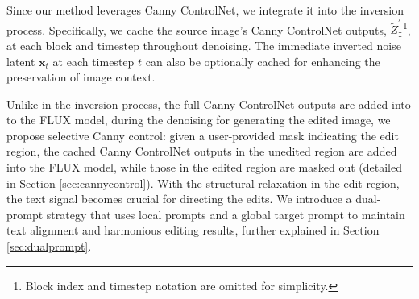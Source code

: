\documentclass{article}
\begin{document}
Since our method leverages Canny ControlNet, we integrate it into the inversion process. Specifically, we cache the source image's Canny ControlNet outputs, $\tilde{Z}^{\prime}_{\texttt{I}}$\footnote{Block index and timestep notation are omitted for simplicity.}, at each block and timestep throughout denoising. The immediate inverted noise latent $\mathbf{x}_t$ at each timestep $t$ can also be optionally cached for enhancing the preservation of image context.


Unlike in the inversion process, the full Canny ControlNet outputs are added into to the FLUX model, during the denoising for generating the edited image, we propose selective Canny control: given a user-provided mask indicating the edit region, the cached Canny ControlNet outputs in the unedited region are added into the FLUX model, while those in the edited region are masked out (detailed in Section \ref{sec:cannycontrol}). With the structural relaxation in the edit region, the text signal becomes crucial for directing the edits. We introduce a dual-prompt strategy that uses local prompts and a global target prompt to maintain text alignment and harmonious editing results, further explained in Section \ref{sec:dualprompt}.


\end{document}
